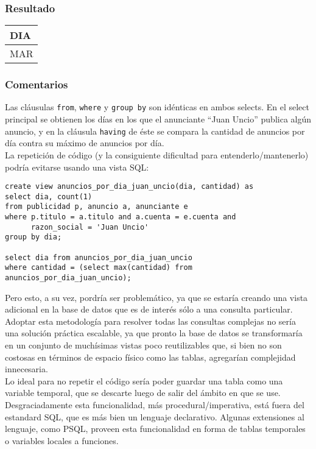 \subsubsection*{Resultado}
\begin{tabular}{|l|}
  \hline
    \bf{DIA} \\ 
  \hline
    MAR \\ 
  \hline
\end{tabular} 

\subsubsection*{Comentarios}

Las cl\'ausulas \lstinline|from|, \lstinline|where| y \lstinline|group by| son id\'enticas en ambos selects. En el select principal se obtienen los d\'ias en los que el anunciante ``Juan Uncio'' publica alg\'un anuncio, y en la cl\'ausula \lstinline|having| de \'este se compara la cantidad de anuncios por d\'ia contra su m\'aximo de anuncios por d\'ia. \\

La repetici\'on de c\'odigo (y la consiguiente dificultad para entenderlo/mantenerlo) podr\'ia evitarse usando una vista SQL:

\begin{lstlisting}
create view anuncios_por_dia_juan_uncio(dia, cantidad) as
select dia, count(1)
from publicidad p, anuncio a, anunciante e
where p.titulo = a.titulo and a.cuenta = e.cuenta and 
      razon_social = 'Juan Uncio'
group by dia;

select dia from anuncios_por_dia_juan_uncio
where cantidad = (select max(cantidad) from anuncios_por_dia_juan_uncio);
\end{lstlisting}

Pero esto, a su vez, pordr\'ia ser problem\'atico, ya que se estar\'ia creando una vista adicional en la base de datos que es de inter\'es s\'olo a una consulta particular. Adoptar esta metodolog\'ia para resolver todas las consultas complejas no ser\'ia una soluci\'on pr\'actica escalable, ya que pronto la base de datos se transformar\'ia en un conjunto de much\'isimas vistas poco reutilizables que, si bien no son costosas en t\'erminos de espacio f\'isico como las tablas, agregar\'ian complejidad innecesaria. \\

Lo ideal para no repetir el c\'odigo ser\'ia poder guardar una tabla como una variable temporal, que se descarte luego de salir del \'ambito en que se use. Desgraciadamente esta funcionalidad, m\'as procedural/imperativa, est\'a fuera del estandard SQL, que es m\'as bien un lenguaje declarativo. Algunas extensiones al lenguaje, como PSQL, proveen esta funcionalidad en forma de tablas temporales o variables locales a funciones.


